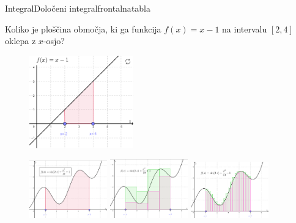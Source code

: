 \begin{priprava}{}{}{Integral}{Določeni integral}{frontalna}{tabla}



Koliko je ploščina območja, ki ga funkcija $ f(x) = x - 1 $ na intervalu $ [2, 4] $ oklepa z $ x $-osjo? 

\begin{figure}[h]
    \centering
    \includegraphics[width=0.4\textwidth]{slike/dol_int_motivacijski_primer.png}
\end{figure}


\begin{figure}[h]
    \centering
    \includegraphics[width=0.3\textwidth]{slike/dol_int_motivacijski_primer2.png}
    \includegraphics[width=0.3\textwidth]{slike/dol_int_motivacijski_primer3.png}
    \includegraphics[width=0.3\textwidth]{slike/dol_int_motivacijski_primer4.png}    
\end{figure}



\end{priprava}
